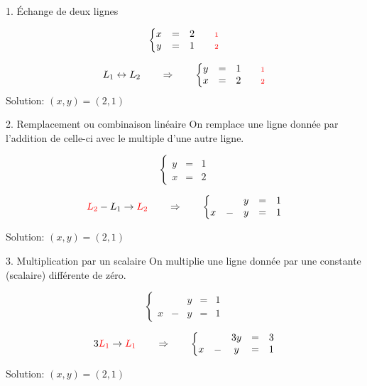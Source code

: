 \documentclass[french]{beamer}
\begin{document}
	\begin{frame}{1. Échange de deux lignes}
	\begin{example}
		\[
		\left\{
		\begin{matrix}
		    x &=& 2{\qquad\scriptstyle\color{red}{1}} \\
		    y&=& 1{\qquad\scriptstyle\color{red}{2}}
		\end{matrix}
		\right.
		\]		
		
		\[
		L_1 \leftrightarrow L_2 \qquad \Rightarrow \qquad
		\left\{
		\begin{matrix}
		    y&=& 1{\qquad\scriptstyle\color{red}{1}}\\
		    x &=& 2{\qquad\color{red}{\scriptstyle 2}}
		\end{matrix}
		\right.
		\]		
		{\tiny\color{blue}Solution: $(x, y) = (2, 1)$}
	\end{example}		
	\end{frame}
	
	
	\begin{frame}{2. Remplacement ou combinaison linéaire}
	On remplace une ligne donnée par l'addition de celle-ci avec le multiple
	d'une autre ligne.
	\begin{example}
		\[
		\left\{
		\begin{matrix}
		    y&=& 1\\
		    x &=& 2
		\end{matrix}
		\right.
		\]		
		

		\[
		{{\color{red}L_2} - L_1 \rightarrow \color{red}L_2}  \qquad \Rightarrow \qquad
		\left\{
		\begin{matrix}
		    &&y&=& 1	\\	
		    x&-&y &=& 1
		\end{matrix}
		\right.
		\]		
			
		{\tiny\color{blue}Solution: $(x, y) = (2, 1)$}
	\end{example}		
	\end{frame}	
	
	
	\begin{frame}{3. Multiplication par un scalaire}
	On multiplie une ligne donnée par une constante (scalaire) différente de zéro.
	\begin{example}
		\[
		\left\{
		\begin{matrix}
		    &&y&=& 1	\\	
		    x&-&y &=& 1
		\end{matrix}
		\right.
		\]		
		
		\[
		{3{\color{red}L_1}\rightarrow \color{red}L_1}  \qquad \Rightarrow \qquad
		\left\{
		\begin{matrix}
		    &&3y&=& 3	\\	
		    x&-&y &=& 1
		\end{matrix}
		\right.
		\]		
			
		{\tiny\color{blue}Solution: $(x, y) = (2, 1)$}
	\end{example}		
	\end{frame}		
	
\end{document}
